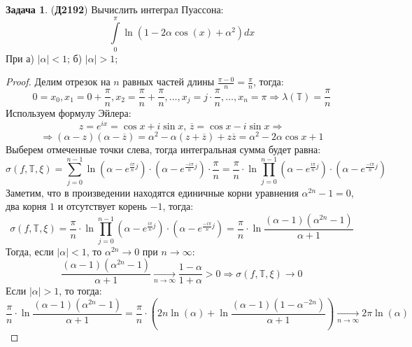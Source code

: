 \documentclass[12pt]{article}
\newcommand{\MTB}{\mathbb{T}}
\theoremstyle{definition}
\newtheorem{problem}{Задача}
\newcommand{\ddsum}[2]{\displaystyle\sum\limits_{#1}^{#2}}
\newcommand{\ddint}[2]{\displaystyle\int\limits_{#1}^{#2}}
\newcommand{\ovl}[1]{\overline{#1}}
\begin{document}
\begin{problem}(\textbf{Д2192})
	Вычислить интеграл Пуассона:
	$$
		\ddint{0}{\pi}\ln(1 - 2\alpha \cos(x) + \alpha^2)dx
	$$
	При а) $|\alpha| <1$; б) $|\alpha| > 1$;
\end{problem}
\begin{proof}
	Делим отрезок на $n$ равных частей длины $\tfrac{\pi - 0}{n} = \tfrac{\pi}{n}$, тогда:
	$$
		0 = x_0, x_1 = 0 + \dfrac{\pi}{n}, x_2 = \dfrac{\pi}{n} + \dfrac{\pi}{n}, \dotsc, x_j = j{\cdot}\dfrac{\pi}{n}, \dotsc, x_n = \pi \Rightarrow \lambda(\MTB) = \dfrac{\pi}{n}
	$$
	Используем формулу Эйлера:
	$$
		z = e^{ix} = \cos{x} + i\sin{x}, \, \ovl{z} = \cos{x} - i \sin{x} \Rightarrow 
	$$
	$$	
		\Rightarrow (\alpha - z)(\alpha - \ovl{z}) = \alpha^2 - \alpha(z + \ovl{z}) + z\ovl{z} = \alpha^2 - 2\alpha\cos{x} + 1
	$$
	Выберем отмеченные точки слева, тогда интегральная сумма будет равна:
	$$
		\sigma(f,\MTB,\xi) = \ddsum{j = 0}{n-1}\ln\left(\alpha - e^{\tfrac{i\pi }{n}j} \right){\cdot}\left(\alpha - e^{\tfrac{-i\pi }{n}j} \right){\cdot}\dfrac{\pi}{n} = \dfrac{\pi}{n}{\cdot}\ln\prod\limits_{j = 0}^{n-1}\left(\alpha - e^{\tfrac{i\pi }{n}j} \right){\cdot}\left(\alpha - e^{\tfrac{-i\pi }{n}j} \right)
	$$
	Заметим, что в произведении находятся единичные корни уравнения $\alpha^{2n} - 1 =0$, два корня $1$ и отсутствует корень $-1$, тогда:
	$$
		\sigma(f,\MTB,\xi) =\dfrac{\pi}{n}{\cdot}\ln\prod\limits_{j = 0}^{n-1}\left(\alpha - e^{\tfrac{i\pi }{n}j} \right){\cdot}\left(\alpha - e^{\tfrac{-i\pi }{n}j} \right) = \dfrac{\pi}{n}{\cdot}\ln\dfrac{(\alpha - 1)(\alpha^{2n} - 1)}{\alpha + 1}  
	$$
	Тогда, если $|\alpha|<1$, то $\alpha^{2n} \to 0$ при $n\to \infty$:
	$$
		\dfrac{(\alpha - 1)(\alpha^{2n} - 1)}{\alpha + 1}  \xrightarrow[n \to \infty]{} \dfrac{1 - \alpha}{1 + \alpha} > 0 \Rightarrow \sigma(f,\MTB,\xi) \to 0
	$$
	Если $|\alpha| > 1$, то тогда:
	$$
		\dfrac{\pi}{n}{\cdot}\ln\dfrac{(\alpha - 1)(\alpha^{2n} - 1)}{\alpha + 1}  = \dfrac{\pi}{n}{\cdot}\left(2n\ln(\alpha) + \ln\dfrac{(\alpha -1)(1 - \alpha^{-2n})}{\alpha + 1}\right) \xrightarrow[n \to \infty]{} 2\pi\ln(\alpha)
	$$
\end{proof}
\end{document}
